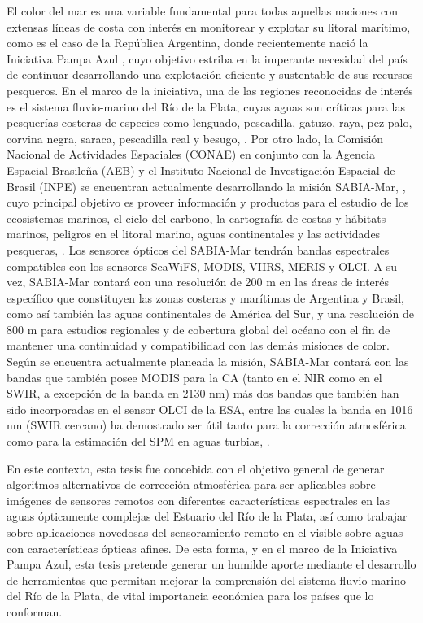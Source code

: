     El color del mar es una variable fundamental para todas aquellas naciones con extensas líneas de costa con interés en monitorear y explotar su litoral marítimo, como es el caso de la República Argentina, donde recientemente nació la Iniciativa Pampa Azul \cite{pampaazul}, cuyo objetivo estriba en la imperante necesidad del país de continuar desarrollando una explotación eficiente y sustentable de sus recursos pesqueros. En el marco de la iniciativa, una de las regiones reconocidas de interés es el sistema fluvio-marino del Río de la Plata, cuyas aguas son críticas para las pesquerías costeras de especies como lenguado, pescadilla, gatuzo, raya, pez palo, corvina negra, saraca, pescadilla real y besugo, \cite{pampaazulrdp}. Por otro lado, la Comisión Nacional de Actividades Espaciales (CONAE) en conjunto con la Agencia Espacial Brasileña (AEB) y el Instituto Nacional de Investigación Espacial de Brasil (INPE) se encuentran actualmente desarrollando la misión SABIA-Mar, \cite{conaeSMar}\cite{invap}, cuyo principal objetivo es proveer información y productos para el estudio de los ecosistemas marinos, el ciclo del carbono, la cartografía de costas y hábitats marinos, peligros en el litoral marino, aguas continentales y las actividades pesqueras, \cite{conaeSMar}. Los sensores ópticos del SABIA-Mar tendrán bandas espectrales compatibles con los sensores SeaWiFS, MODIS, VIIRS, MERIS y OLCI. A su vez, SABIA-Mar contará con una resolución de 200 m en las áreas de interés específico que constituyen las zonas costeras y marítimas de Argentina y Brasil, como así también las aguas continentales de América del Sur, y una resolución de 800 m para estudios regionales y de cobertura global del océano con el fin de mantener una continuidad y compatibilidad con las demás misiones de color. Según se encuentra actualmente planeada la misión, SABIA-Mar contará con las bandas que también posee MODIS para la CA (tanto en el NIR como en el SWIR, a excepción de la banda en 2130 nm) más dos bandas que también han sido incorporadas en el sensor OLCI de la ESA, entre las cuales la banda en 1016 nm (SWIR cercano) ha demostrado ser útil tanto para la corrección atmosférica como para la estimación del SPM en aguas turbias, \cite{gossn2019}\cite{knaeps2012}.

    En este contexto, esta tesis fue concebida con el objetivo general de generar algoritmos alternativos de corrección atmosférica para ser aplicables sobre imágenes de sensores remotos con diferentes características espectrales en las aguas ópticamente complejas del Estuario del Río de la Plata, así como trabajar sobre aplicaciones novedosas del sensoramiento remoto en el visible sobre aguas con características ópticas afines. De esta forma, y en el marco de la Iniciativa Pampa Azul, esta tesis pretende generar un humilde aporte mediante el desarrollo de herramientas que permitan mejorar la comprensión del sistema fluvio-marino del Río de la Plata, de vital importancia económica para los países que lo conforman.
    
